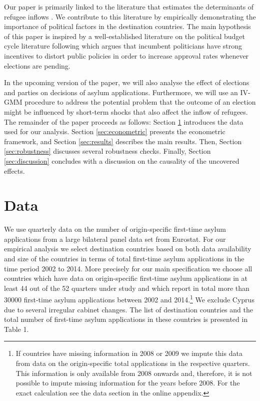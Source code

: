 \documentclass[a4paper,12pt]{article}
\begin{document}
Our paper is primarily linked to the literature that estimates the determinants of refugee inflows \citep{czaika2009, gudbrandsen2010, hatton2009, hatton2016, hatton2015,holzer2000, moore2007, neumayer2004, neumayer2005,toshkov2014}. We contribute to this literature by empirically demonstrating the importance of political factors in the destination countries. The main hypothesis of this paper is inspired by a well-established literature on the political budget cycle literature following \citet{nor75} which argues that incumbent politicians have strong incentives to distort public policies in order to increase approval rates whenever elections are pending.

In the upcoming version of the paper, we will also analyse the effect of elections and parties on decisions of asylum applications. Furthermore, we will use an IV-GMM procedure to address the potential problem that the outcome of an election might be influenced by short-term shocks that also affect the inflow of refugees. The remainder of the paper proceeds as follows: Section \ref{sec:data} introduces the data used for our analysis. Section \ref{sec:econometric} presents the econometric framework, and Section \ref{sec:results} describes the main results. Then, Section \ref{sec:robustness} discusses several robustness checks. Finally, Section \ref{sec:discussion} concludes with a discussion on the causality of the uncovered effects.

 
\section{Data} \label{sec:data}

We use quarterly data on the number of  origin-specific first-time asylum applications  from a large bilateral panel data set from Eurostat. For our empirical analysis we select destination countries based on both data availability and size of the countries in terms of total first-time asylum applications in the time period 2002 to 2014. More precisely for our main specification we choose all countries which have data on origin-specific first-time asylum applications in at least 44 out of the 52 quarters under study and which report in total more than 30000 first-time asylum applications between 2002 and 2014.\footnote{If countries have missing information in 2008 or 2009 we impute this data from data on the origin-specific total applications in the respective quarters. This information is only available from 2008 onwards and, therefore, it is not possible to impute missing information for the years before 2008. For the exact calculation see the data section in the online appendix.}  We exclude Cyprus due to several irregular cabinet changes. The list of destination countries and the total number of first-time asylum applications in these countries is presented in Table 1.
\end{document}
